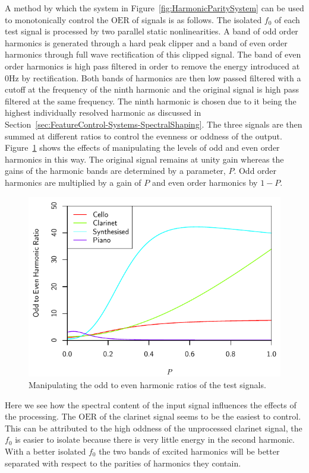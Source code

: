 		A method by which the system in Figure~\ref{fig:HarmonicParitySystem} can be used to monotonically control
		the $\mathrm{OER}$ of signals is as follows. The isolated $f_{0}$ of each test signal is processed by two
		parallel static nonlinearities. A band of odd order harmonics is generated through a hard peak clipper and
		a band of even order harmonics through full wave rectification of this clipped signal. The band of even
		order harmonics is high pass filtered in order to remove the energy introduced at 0Hz by rectification.
		Both bands of harmonics are then low passed filtered with a cutoff at the frequency of the ninth harmonic
		and the original signal is high pass filtered at the same frequency. The ninth harmonic is chosen due to it
		being the highest individually resolved harmonic as discussed in
		Section~\ref{sec:FeatureControl-Systems-SpectralShaping}. The three signals are then summed at different
		ratios to control the evenness or oddness of the output.  Figure~\ref{fig:MoveParities} shows the effects
		of manipulating the levels of odd and even order harmonics in this way. The original signal remains at
		unity gain whereas the gains of the harmonic bands are determined by a parameter, $P$.  Odd order harmonics
		are multiplied by a gain of $P$ and even order harmonics by $1 - P$.

		\begin{figure}[h!]
			\centering
			\includegraphics{chapter6/Images/MoveParities.pdf}
			\caption{Manipulating the odd to even harmonic ratios of the test signals.}
			\label{fig:MoveParities}
		\end{figure}

		Here we see how the spectral content of the input signal influences the effects of the processing.  The
		$\mathrm{OER}$ of the clarinet signal seems to be the easiest to control. This can be attributed to the
		high oddness of the unprocessed clarinet signal, the $f_{0}$ is easier to isolate because there is very
		little energy in the second harmonic. With a better isolated $f_{0}$ the two bands of excited harmonics
		will be better separated with respect to the parities of harmonics they contain.

